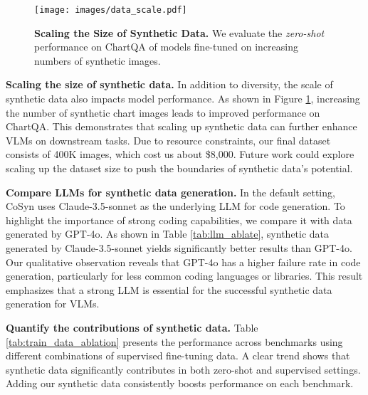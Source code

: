 

\begin{figure}[!ht]
\vspace{-.2cm}
  \begin{center}
    \texttt{[image: images/data\_scale.pdf]}
  \end{center}
  \vspace{-.2cm}
  \caption{\textbf{Scaling the Size of Synthetic Data.} We evaluate the \textit{zero-shot} performance on ChartQA of models fine-tuned on increasing numbers of synthetic images.}
  \vspace{-.2cm}
\label{fig: scale}
\end{figure}

\smallbreak
\noindent \textbf{Scaling the size of synthetic data.} In addition to diversity, the scale of synthetic data also impacts model performance. 
As shown in Figure \ref{fig: scale}, increasing the number of synthetic chart images leads to improved performance on ChartQA. This demonstrates that scaling up synthetic data can further enhance VLMs on downstream tasks. 
Due to resource constraints, our final dataset consists of 400K images, which cost us about \$8,000.
Future work could explore scaling up the dataset size to push the boundaries of synthetic data's potential.




\smallbreak

\noindent \textbf{Compare LLMs for synthetic data generation.} In the default setting, CoSyn uses Claude-3.5-sonnet as the underlying LLM for code generation. 
\noindent To highlight the importance of strong coding capabilities, we compare it with data generated by GPT-4o. 
As shown in Table \ref{tab:llm_ablate}, synthetic data generated by Claude-3.5-sonnet yields significantly better results than GPT-4o.
Our qualitative observation reveals that GPT-4o has a higher failure rate in code generation, particularly for less common coding languages or libraries. 
This result emphasizes that a strong LLM is essential for the successful synthetic data generation for VLMs.


\smallbreak
\noindent \textbf{Quantify the contributions of synthetic data.} Table \ref{tab:train_data_ablation} presents the performance across benchmarks using different combinations of supervised fine-tuning data. 
A clear trend shows that synthetic data significantly contributes in both zero-shot and supervised settings. 
Adding our synthetic data consistently boosts performance on each benchmark.

